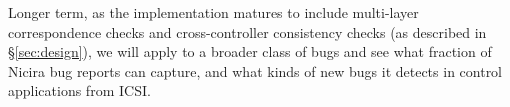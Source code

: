    Longer term, as the \projectname{} implementation matures to include multi-layer correspondence checks and cross-controller consistency checks (as described in \S\ref{sec:design}), we will apply \projectname{} to a broader class of bugs and see what fraction of Nicira bug reports \projectname{} can capture, and what kinds of new bugs it detects in control applications from ICSI. 


